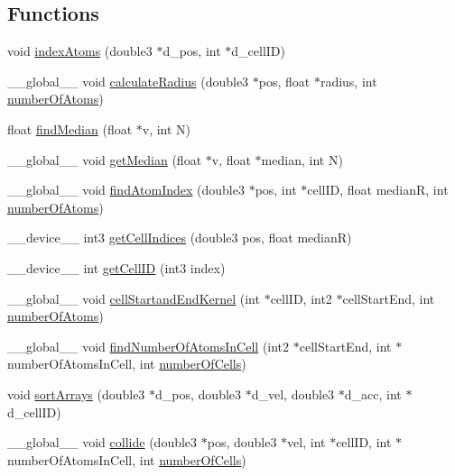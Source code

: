 \subsection*{Functions}
\begin{DoxyCompactItemize}
\item 
void \hyperlink{collisions_8cu_af197639ca430cb8ebe15f6ca7b6f40ab}{index\+Atoms} (double3 $\ast$d\+\_\+pos, int $\ast$d\+\_\+cell\+I\+D)
\item 
\+\_\+\+\_\+global\+\_\+\+\_\+ void \hyperlink{collisions_8cu_a5ccf998d9adc2625a01e1438fef20c0c}{calculate\+Radius} (double3 $\ast$pos, float $\ast$radius, int \hyperlink{initial_system_parameters_8cuh_a5ce690e43012981ef3034cbf0c746489}{number\+Of\+Atoms})
\item 
float \hyperlink{collisions_8cu_ad5d1d3a668210a5440e936d793155b29}{find\+Median} (float $\ast$v, int N)
\item 
\+\_\+\+\_\+global\+\_\+\+\_\+ void \hyperlink{collisions_8cu_ac1c69ba0a5974180aaacf6bb1fe83278}{get\+Median} (float $\ast$v, float $\ast$median, int N)
\item 
\+\_\+\+\_\+global\+\_\+\+\_\+ void \hyperlink{collisions_8cu_a58c3c9352a43130c74ebe2f70308fb49}{find\+Atom\+Index} (double3 $\ast$pos, int $\ast$cell\+I\+D, float median\+R, int \hyperlink{initial_system_parameters_8cuh_a5ce690e43012981ef3034cbf0c746489}{number\+Of\+Atoms})
\item 
\+\_\+\+\_\+device\+\_\+\+\_\+ int3 \hyperlink{collisions_8cu_a695113a00662455ab948335ebd4f5d4d}{get\+Cell\+Indices} (double3 pos, float median\+R)
\item 
\+\_\+\+\_\+device\+\_\+\+\_\+ int \hyperlink{collisions_8cu_a81f6e38ecb6fb429a8ed20023a87571f}{get\+Cell\+I\+D} (int3 index)
\item 
\+\_\+\+\_\+global\+\_\+\+\_\+ void \hyperlink{collisions_8cu_aa4ade56a340c2c03dc05ee50cd66e9cb}{cell\+Startand\+End\+Kernel} (int $\ast$cell\+I\+D, int2 $\ast$cell\+Start\+End, int \hyperlink{initial_system_parameters_8cuh_a5ce690e43012981ef3034cbf0c746489}{number\+Of\+Atoms})
\item 
\+\_\+\+\_\+global\+\_\+\+\_\+ void \hyperlink{collisions_8cu_aa1ebf4327d2fdae4fb65c2d6246af28a}{find\+Number\+Of\+Atoms\+In\+Cell} (int2 $\ast$cell\+Start\+End, int $\ast$number\+Of\+Atoms\+In\+Cell, int \hyperlink{initial_system_parameters_8cuh_ae88ac292f19dd72c295602c5dbb17bd6}{number\+Of\+Cells})
\item 
void \hyperlink{collisions_8cu_ae795ca12557f5648cfc29a292280591e}{sort\+Arrays} (double3 $\ast$d\+\_\+pos, double3 $\ast$d\+\_\+vel, double3 $\ast$d\+\_\+acc, int $\ast$d\+\_\+cell\+I\+D)
\item 
\+\_\+\+\_\+global\+\_\+\+\_\+ void \hyperlink{collisions_8cu_a234c8db8e15b25ca114203652185a8af}{collide} (double3 $\ast$pos, double3 $\ast$vel, int $\ast$cell\+I\+D, int $\ast$number\+Of\+Atoms\+In\+Cell, int \hyperlink{initial_system_parameters_8cuh_ae88ac292f19dd72c295602c5dbb17bd6}{number\+Of\+Cells})
\end{DoxyCompactItemize}


